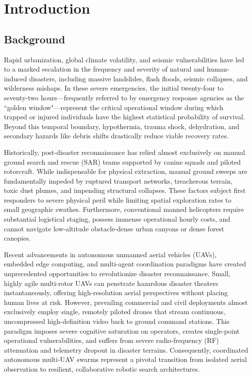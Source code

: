 \chapter{Introduction}

\section{Background}

Rapid urbanization, global climate volatility, and seismic vulnerabilities have led to a marked escalation in the frequency and severity of natural and human-induced disasters, including massive landslides, flash floods, seismic collapses, and wilderness mishaps. In these severe emergencies, the initial twenty-four to seventy-two hours---frequently referred to by emergency response agencies as the ``golden window"---represent the critical operational window during which trapped or injured individuals have the highest statistical probability of survival. Beyond this temporal boundary, hypothermia, trauma shock, dehydration, and secondary hazards like debris shifts drastically reduce viable recovery rates.

Historically, post-disaster reconnaissance has relied almost exclusively on manual ground search and rescue (SAR) teams supported by canine squads and piloted rotorcraft. While indispensable for physical extraction, manual ground sweeps are fundamentally impeded by ruptured transport networks, treacherous terrain, toxic dust plumes, and impending structural collapses. These factors subject first responders to severe physical peril while limiting spatial exploration rates to small geographic swathes. Furthermore, conventional manned helicopters require substantial logistical staging, possess immense operational hourly costs, and cannot navigate low-altitude obstacle-dense urban canyons or dense forest canopies.

Recent advancements in autonomous unmanned aerial vehicles (UAVs), embedded edge computing, and multi-agent coordination paradigms have created unprecedented opportunities to revolutionize disaster reconnaissance. Small, highly agile multi-rotor UAVs can penetrate hazardous disaster theaters instantaneously, offering high-resolution aerial perspectives without placing human lives at risk. However, prevailing commercial and civil deployments almost exclusively employ single, remotely piloted drones that stream continuous, uncompressed high-definition video back to ground command stations. This paradigm imposes severe cognitive saturation on operators, creates single-point operational vulnerabilities, and suffers from severe radio-frequency (RF) attenuation and telemetry dropout in disaster terrains. Consequently, coordinated autonomous multi-UAV swarms represent a pivotal transition from isolated aerial observation to resilient, collaborative robotic search architectures.

